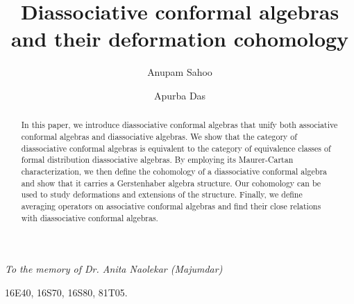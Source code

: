 \documentclass[a4paper,reqno,10pt]{amsart}
\title{}
\author{}
\date{}
\theoremstyle{plain}
\theoremstyle{definition}
\theoremstyle{remark}
\begin{document}


\title[Diassociative conformal algebras and their deformation cohomology]{Diassociative conformal algebras and their deformation cohomology}


\author{Anupam Sahoo}
\address{Department of Mathematics,
Indian Institute of Technology, Kharagpur 721302, West Bengal, India.}

\author{Apurba Das}
\address{Department of Mathematics,
Indian Institute of Technology, Kharagpur 721302, West Bengal, India.}






\begin{abstract}
In this paper, we introduce diassociative conformal algebras that unify both associative conformal algebras and diassociative algebras. We show that the category of diassociative conformal algebras is equivalent to the category of equivalence classes of formal distribution diassociative algebras. By employing its Maurer-Cartan characterization, we then define the cohomology of a diassociative conformal algebra and show that it carries a Gerstenhaber algebra structure. Our cohomology can be used to study deformations and extensions of the structure. Finally, we define averaging operators on associative conformal algebras and find their close relations with diassociative conformal algebras.
\end{abstract}

\maketitle

\begin{center}
    {\em To the memory of Dr. Anita Naolekar (Majumdar)}
\end{center}

\medskip

\medskip

 16E40, 16S70, 16S80, 81T05.
\end{document}
